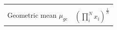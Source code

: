 \documentclass[
]{book}
\begin{document}
\begin{longtable}[]{@{}
  >{\raggedright\arraybackslash}p{}
  >{\raggedright\arraybackslash}p{}@{}}
                                                                                                                                                                                                                                                                                                                                                                                                                                                                                                                                                                                                                                          \) \\
Geometric mean \(\mu_{ge}\) & \(                                                                                                                                                                                                                                                                                                                                                                                                                                                                                                                                                                                                                                                                                                                                                                               
                                                                                                                                                                                                                                                                                                                                                                                                                                                                                                                                                                                                                                          (\prod_i^N x_i)^{\frac{1}{N}}                                                                                                                                        
                                                                                                                                                                                                                                                                                                                                                                                                                                                                                                                                                                                                                                          \) \\

\end{longtable}
\end{document}
